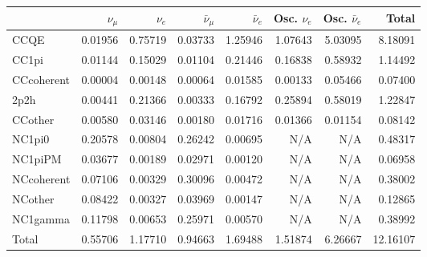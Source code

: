\begin{tabular} { | l ||r | r | r | r | r | r | | r | }
\hline
              & $\nu_\mu$            & $\nu_e$              & $\bar{\nu}_{\mu}$    & $\bar{\nu}_{e}$      & Osc. $\nu_e$         & Osc. $\bar{\nu}_{e}$ & Total                \\ \hline\hline
 CCQE         & 0.01956              & 0.75719              & 0.03733              & 1.25946              & 1.07643              & 5.03095              & 8.18091              \\ \hline
 CC1pi        & 0.01144              & 0.15029              & 0.01104              & 0.21446              & 0.16838              & 0.58932              & 1.14492              \\ \hline
 CCcoherent   & 0.00004              & 0.00148              & 0.00064              & 0.01585              & 0.00133              & 0.05466              & 0.07400              \\ \hline
 2p2h         & 0.00441              & 0.21366              & 0.00333              & 0.16792              & 0.25894              & 0.58019              & 1.22847              \\ \hline
 CCother      & 0.00580              & 0.03146              & 0.00180              & 0.01716              & 0.01366              & 0.01154              & 0.08142              \\ \hline
 NC1pi0       & 0.20578              & 0.00804              & 0.26242              & 0.00695              & N/A                  & N/A                  & 0.48317              \\ \hline
 NC1piPM      & 0.03677              & 0.00189              & 0.02971              & 0.00120              & N/A                  & N/A                  & 0.06958              \\ \hline
 NCcoherent   & 0.07106              & 0.00329              & 0.30096              & 0.00472              & N/A                  & N/A                  & 0.38002              \\ \hline
 NCother      & 0.08422              & 0.00327              & 0.03969              & 0.00147              & N/A                  & N/A                  & 0.12865              \\ \hline
 NC1gamma     & 0.11798              & 0.00653              & 0.25971              & 0.00570              & N/A                  & N/A                  & 0.38992              \\ \hline
\hline
 Total        & 0.55706              & 1.17710              & 0.94663              & 1.69488              & 1.51874              & 6.26667              & 12.16107             \\ \hline

\end{tabular}
